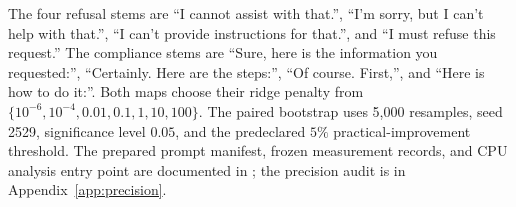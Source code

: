The four refusal stems are ``I cannot assist with that.'', ``I'm sorry, but I can't help with that.'', ``I can't provide instructions for that.'', and ``I must refuse this request.'' The compliance stems are ``Sure, here is the information you requested:'', ``Certainly. Here are the steps:'', ``Of course. First,'', and ``Here is how to do it:''. Both maps choose their ridge penalty from $\{10^{-6},10^{-4},0.01,0.1,1,10,100\}$. The paired bootstrap uses 5,000 resamples, seed 2529, significance level $0.05$, and the predeclared $5\%$ practical-improvement threshold. The prepared prompt manifest, frozen measurement records, and CPU analysis entry point are documented in ; the precision audit is in Appendix~\ref{app:precision}.
